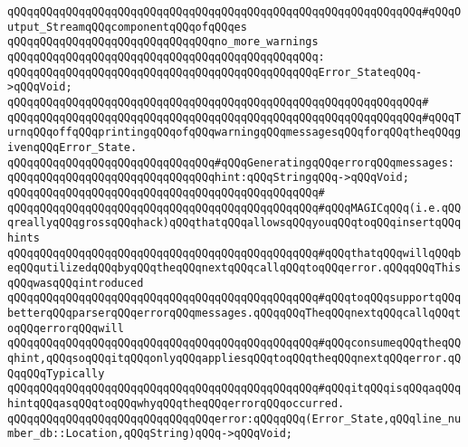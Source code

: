 \verb|qQQqqQQqqQQqqQQqqQQqqQQqqQQqqQQqqQQqqQQqqQQqqQQqqQQqqQQqqQQqqQQq#qQQqOutput_StreamqQQqcomponentqQQqofqQQqes|\newline
\newline
\verb|qQQqqQQqqQQqqQQqqQQqqQQqqQQqqQQqno_more_warnings|\newline
\verb|qQQqqQQqqQQqqQQqqQQqqQQqqQQqqQQqqQQqqQQqqQQqqQQq:|\newline
\verb|qQQqqQQqqQQqqQQqqQQqqQQqqQQqqQQqqQQqqQQqqQQqqQQqError_StateqQQq->qQQqVoid;|\newline
\verb|qQQqqQQqqQQqqQQqqQQqqQQqqQQqqQQqqQQqqQQqqQQqqQQqqQQqqQQqqQQqqQQq#|\newline
\verb|qQQqqQQqqQQqqQQqqQQqqQQqqQQqqQQqqQQqqQQqqQQqqQQqqQQqqQQqqQQqqQQq#qQQqTurnqQQqoffqQQqprintingqQQqofqQQqwarningqQQqmessagesqQQqforqQQqtheqQQqgivenqQQqError_State.|\newline
\newline
\newline
\newline
\verb|qQQqqQQqqQQqqQQqqQQqqQQqqQQqqQQq#qQQqGeneratingqQQqerrorqQQqmessages:|\newline
\newline
\verb|qQQqqQQqqQQqqQQqqQQqqQQqqQQqqQQqhint:qQQqStringqQQq->qQQqVoid;|\newline
\verb|qQQqqQQqqQQqqQQqqQQqqQQqqQQqqQQqqQQqqQQqqQQqqQQq#|\newline
\verb|qQQqqQQqqQQqqQQqqQQqqQQqqQQqqQQqqQQqqQQqqQQqqQQq#qQQqMAGICqQQq(i.e.qQQqreallyqQQqgrossqQQqhack)qQQqthatqQQqallowsqQQqyouqQQqtoqQQqinsertqQQqhints|\newline
\verb|qQQqqQQqqQQqqQQqqQQqqQQqqQQqqQQqqQQqqQQqqQQqqQQq#qQQqthatqQQqwillqQQqbeqQQqutilizedqQQqbyqQQqtheqQQqnextqQQqcallqQQqtoqQQqerror.qQQqqQQqThisqQQqwasqQQqintroduced|\newline
\verb|qQQqqQQqqQQqqQQqqQQqqQQqqQQqqQQqqQQqqQQqqQQqqQQq#qQQqtoqQQqsupportqQQqbetterqQQqparserqQQqerrorqQQqmessages.qQQqqQQqTheqQQqnextqQQqcallqQQqtoqQQqerrorqQQqwill|\newline
\verb|qQQqqQQqqQQqqQQqqQQqqQQqqQQqqQQqqQQqqQQqqQQqqQQq#qQQqconsumeqQQqtheqQQqhint,qQQqsoqQQqitqQQqonlyqQQqappliesqQQqtoqQQqtheqQQqnextqQQqerror.qQQqqQQqTypically|\newline
\verb|qQQqqQQqqQQqqQQqqQQqqQQqqQQqqQQqqQQqqQQqqQQqqQQq#qQQqitqQQqisqQQqaqQQqhintqQQqasqQQqtoqQQqwhyqQQqtheqQQqerrorqQQqoccurred.|\newline
\newline
\verb|qQQqqQQqqQQqqQQqqQQqqQQqqQQqqQQqerror:qQQqqQQq(Error_State,qQQqline_number_db::Location,qQQqString)qQQq->qQQqVoid;|\newline
